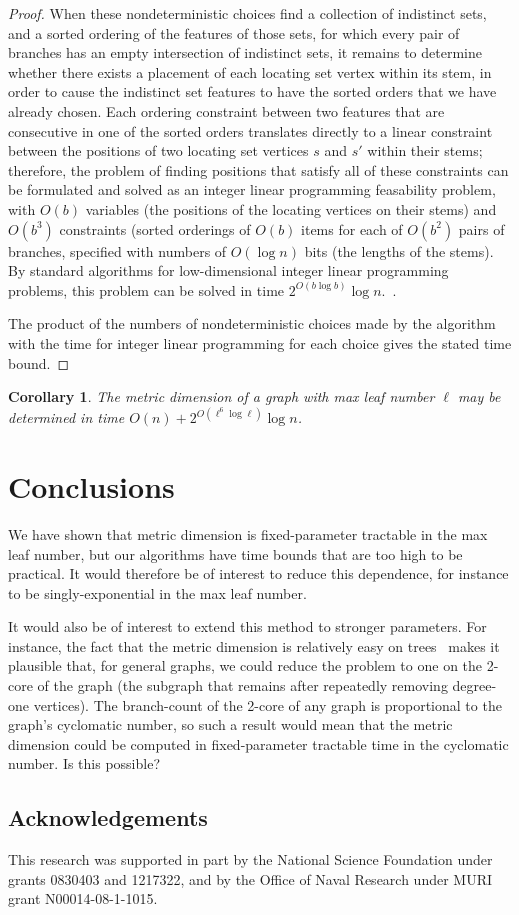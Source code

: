 \documentclass{jgaa-art}
\newtheorem{corollary}{Corollary}
\begin{document}
\begin{proof}
When these nondeterministic choices find a collection of indistinct sets, and a sorted ordering of the features of those sets, for which every pair of branches has an empty intersection of indistinct sets, it remains to determine whether there exists a placement of each locating set vertex within its stem, in order to cause the indistinct set features to have the sorted orders that we have already chosen. Each ordering constraint between two features that are consecutive in one of the sorted orders translates directly to a linear constraint between the positions of two locating set vertices $s$ and $s'$ within their stems; therefore, the problem of finding positions that satisfy all of these constraints can be formulated and solved as an integer linear programming feasability problem, with $O(b)$ variables (the positions of the locating vertices on their stems) and $O(b^3)$ constraints (sorted orderings of $O(b)$ items for each of $O(b^2)$ pairs of branches, specified with numbers of $O(\log n)$ bits (the lengths of the stems).
By standard algorithms for low-dimensional integer linear programming problems, this problem can be solved in time $2^{O(b\log b)}\log n$.~\cite{Len-MOR-83,Kan-MOR-87,FraTar-Comb-87,Cla-JACM-95}.

The product of the numbers of nondeterministic choices made by the algorithm with the time for integer linear programming for each choice gives the stated time bound.
\end{proof}

\begin{corollary}
The metric dimension of a graph with max leaf number $\ell$ may be determined in time $O(n)+2^{O(\ell^6\log \ell)}\log n$.
\end{corollary}

\section{Conclusions}

We have shown that metric dimension is fixed-parameter tractable in the max leaf number, but our algorithms have time bounds that are too high to be practical. It would therefore be of interest to reduce this dependence, for instance to be singly-exponential in the max leaf number.

It would also be of interest to extend this method to stronger parameters. For instance, the fact that the metric dimension is relatively easy on trees~\cite{HarMel-AC-76} makes it plausible that, for general graphs, we could reduce the problem to one on the 2-core of the graph (the subgraph that remains after repeatedly removing degree-one vertices). The branch-count of the 2-core of any graph is proportional to the graph's cyclomatic number, so such a result would mean that the metric dimension could be computed in fixed-parameter tractable time in the cyclomatic number. Is this possible?

\subsection*{Acknowledgements}
This research was supported in part  by the National Science Foundation under grants 0830403 and 1217322, and by the Office of Naval Research under MURI grant N00014-08-1-1015.

{\raggedright

}
\end{document}
